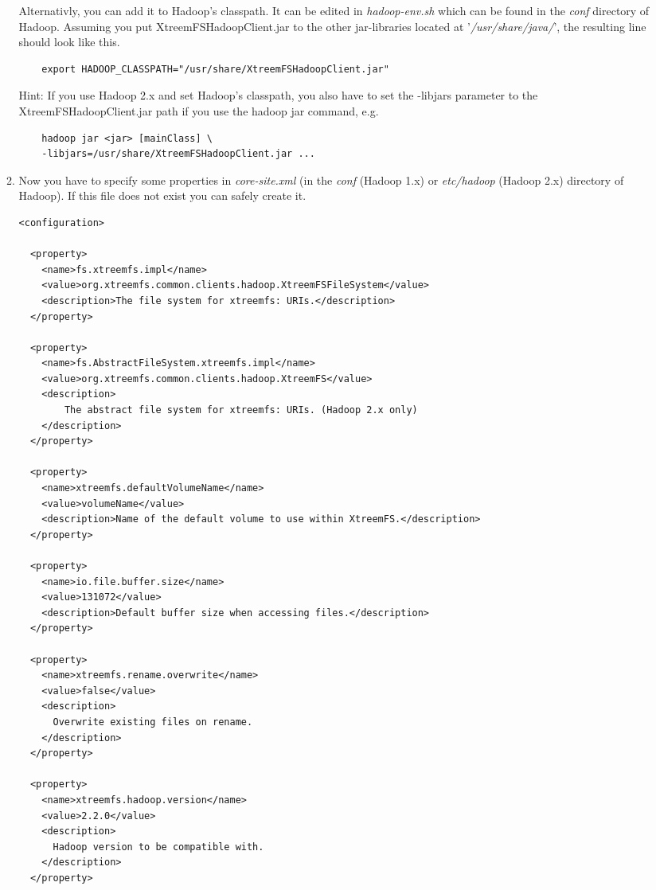 \documentclass[a4paper,10pt]{book}
\begin{document}
\begin{enumerate}
\begin{enumerate}
	Alternativly, you can add it to Hadoop's classpath. It can be edited in \textit{hadoop-env.sh} which can be found in the \textit{conf} directory of Hadoop. Assuming you put XtreemFSHadoopClient.jar to the other jar-libraries located at '\textit{/usr/share/java/}', the resulting line should look like this.
	\begin{verbatim}
	export HADOOP_CLASSPATH="/usr/share/XtreemFSHadoopClient.jar"
	\end{verbatim}
Hint: If you use Hadoop 2.x and set Hadoop's classpath, you also have to set the -libjars parameter to the XtreemFSHadoopClient.jar path if you use the hadoop jar command, e.g.
    \begin{verbatim}
	hadoop jar <jar> [mainClass] \
	-libjars=/usr/share/XtreemFSHadoopClient.jar ...
    \end{verbatim}
	\item Now you have to specify some properties in \textit{core-site.xml} (in the \textit{conf} (Hadoop 1.x) or \textit{etc/hadoop} (Hadoop 2.x)
	directory of Hadoop). If this file does not exist you can safely create it.
	\begin{verbatim}
<configuration>

  <property>
    <name>fs.xtreemfs.impl</name>
    <value>org.xtreemfs.common.clients.hadoop.XtreemFSFileSystem</value>
    <description>The file system for xtreemfs: URIs.</description>
  </property>

  <property>
    <name>fs.AbstractFileSystem.xtreemfs.impl</name>
    <value>org.xtreemfs.common.clients.hadoop.XtreemFS</value>
    <description>
        The abstract file system for xtreemfs: URIs. (Hadoop 2.x only)
    </description>
  </property>
  
  <property>
    <name>xtreemfs.defaultVolumeName</name>
    <value>volumeName</value>
    <description>Name of the default volume to use within XtreemFS.</description>
  </property>

  <property>
    <name>io.file.buffer.size</name>
    <value>131072</value>
    <description>Default buffer size when accessing files.</description>
  </property>
  
  <property>
    <name>xtreemfs.rename.overwrite</name>
    <value>false</value>
    <description>
      Overwrite existing files on rename.
    </description>
  </property>
  
  <property>
    <name>xtreemfs.hadoop.version</name>
    <value>2.2.0</value>
    <description>
      Hadoop version to be compatible with.
    </description>
  </property>


\end{verbatim}
\end{enumerate}
\end{enumerate}
\end{document}
